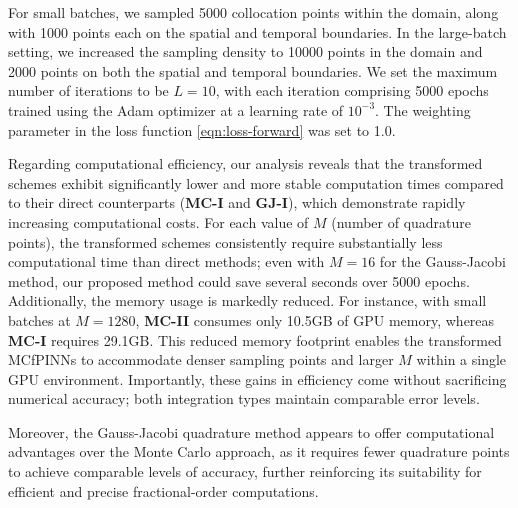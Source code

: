 \documentclass[preprint,3p,times]{elsarticle}
\begin{document}
For small batches, we sampled 5000 collocation points within the domain, along with 1000 points each on the spatial and temporal boundaries. In the large-batch setting, we increased the sampling density to 10000 points in the domain and 2000 points on both the spatial and temporal boundaries. We set the maximum number of iterations to be $L=10$, with each iteration comprising 5000 epochs trained using the Adam optimizer at a learning rate of $10^{-3}$. The weighting parameter in the loss function \eqref{eqn:loss-forward} was set to 1.0. 

Regarding computational efficiency, our analysis reveals that the transformed schemes exhibit significantly lower and more stable computation times compared to their direct counterparts (\textbf{MC-I} and \textbf{GJ-I}), which demonstrate rapidly increasing computational costs. For each value of $M$ (number of quadrature points), the transformed schemes consistently require substantially less computational time than direct methods; even with $M=16$ for the Gauss-Jacobi method, our proposed method could save several seconds over 5000 epochs. Additionally, the memory usage is markedly reduced. For instance, with small batches at $M=1280$, \textbf{MC-II} consumes only 10.5GB of GPU memory, whereas \textbf{MC-I} requires 29.1GB. This reduced memory footprint enables the transformed MCfPINNs to accommodate denser sampling points and larger $M$ within a single GPU environment. Importantly, these gains in efficiency come without sacrificing numerical accuracy; both integration types maintain comparable error levels.

Moreover, the Gauss-Jacobi quadrature method appears to offer computational advantages over the Monte Carlo approach, as it requires fewer quadrature points to achieve comparable levels of accuracy, further reinforcing its suitability for efficient and precise fractional-order computations.
\end{document}
